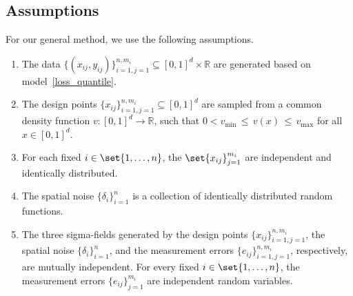 \documentclass[twoside,11pt]{article}
\newcommand{\rev}[1]{{\color{revisionred}#1}}
\begin{document}
\subsection{Assumptions}
\begin{assumption}
    \label{Assumption 1.} For our general method, we use the following assumptions. 

\begin{enumerate}[label={\bfseries\arabic*.}, ref={\ref{Assumption 1.}.\arabic*}]
\item\label{ass_1_1} The data $\{(x_{ij},y_{ij})\}_{i=1,j=1}^{n,m_i} \subseteq [0,1]^d \times \mathbb{R}$ are generated based on model~\eqref{loss_quantile}.
\item
\label{ass_1_1_1} The design points \(\{x_{ij}\}_{i=1,j=1}^{n,m_i} \subseteq [0,1]^{d}\) are sampled from a common density function \(v : [0,1]^{d} \rightarrow \mathbb{R}\), such that \(0 < v_{\min} \,\leq\, v(x) \,\leq\, v_{\max}\) for all \(x \in [0,1]^{d}\). 
\item 
\label{ass_1_2}\rev{For each fixed $i \in \set{1, \dots, n}$, the $\set{x_{ij}}_{j=1}^{m_i}$ are independent and identically distributed.}
\item \label{ass_1_3}\rev{The spatial noise $\{\delta_i\}_{i=1}^{n}$ is a collection of identically distributed random functions.}
\item \label{ass_1_4}\rev{The three sigma-fields generated by the design points $\{x_{ij}\}_{i=1,j=1}^{n,m_i}$, the spatial noise $\{\delta_i\}_{i=1}^{n}$, and the measurement errors $\{e_{ij}\}_{i=1,j=1}^{n,m_i}$, respectively, are mutually independent. For every fixed $i \in \set{1,\dots,n}$, the measurement errors $\{e_{ij}\}_{j=1}^{m_i}$ are independent random variables.}

\end{enumerate}
\end{assumption}
\end{document}
